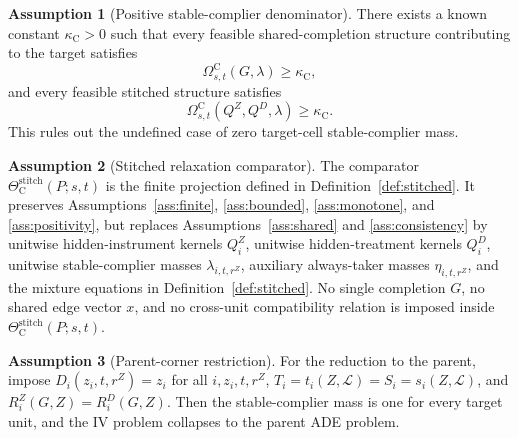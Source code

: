 \documentclass[11pt]{article}
\theoremstyle{definition}
\newtheorem{assumption}{Assumption}
\theoremstyle{plain}
\theoremstyle{remark}
\begin{document}
\begin{assumption}[Positive stable-complier denominator]\label{ass:positive-complier}
There exists a known constant \(\kappa_{\mathrm C}>0\) such that every feasible shared-completion structure contributing to the target satisfies
\[
\Omega^{\mathrm C}_{s,t}(G,\lambda)\ge \kappa_{\mathrm C},
\]
and every feasible stitched structure satisfies
\[
\Omega^{\mathrm C}_{s,t}(Q^Z,Q^D,\lambda)\ge \kappa_{\mathrm C}.
\]
This rules out the undefined case of zero target-cell stable-complier mass.
\end{assumption}

\begin{assumption}[Stitched relaxation comparator]\label{ass:stitch}
The comparator \(\Theta_{\mathrm{C}}^{\mathrm{stitch}}(P;s,t)\) is the finite projection defined in Definition~\ref{def:stitched}. It preserves Assumptions~\ref{ass:finite}, \ref{ass:bounded}, \ref{ass:monotone}, and \ref{ass:positivity}, but replaces Assumptions~\ref{ass:shared} and \ref{ass:consistency} by unitwise hidden-instrument kernels \(Q_i^Z\), unitwise hidden-treatment kernels \(Q_i^D\), unitwise stable-complier masses \(\lambda_{i,t,r^Z}\), auxiliary always-taker masses \(\eta_{i,t,r^Z}\), and the mixture equations in Definition~\ref{def:stitched}. No single completion \(G\), no shared edge vector \(x\), and no cross-unit compatibility relation is imposed inside \(\Theta_{\mathrm{C}}^{\mathrm{stitch}}(P;s,t)\).
\end{assumption}

\begin{assumption}[Parent-corner restriction]\label{ass:parent-corner}
For the reduction to the parent, impose \(D_i(z_i,t,r^Z)=z_i\) for all \(i,z_i,t,r^Z\), \(T_i=t_i(Z,\mathcal L)=S_i=s_i(Z,\mathcal L)\), and \(R_i^Z(G,Z)=R_i^D(G,Z)\). Then the stable-complier mass is one for every target unit, and the IV problem collapses to the parent ADE problem.
\end{assumption}
\end{document}
